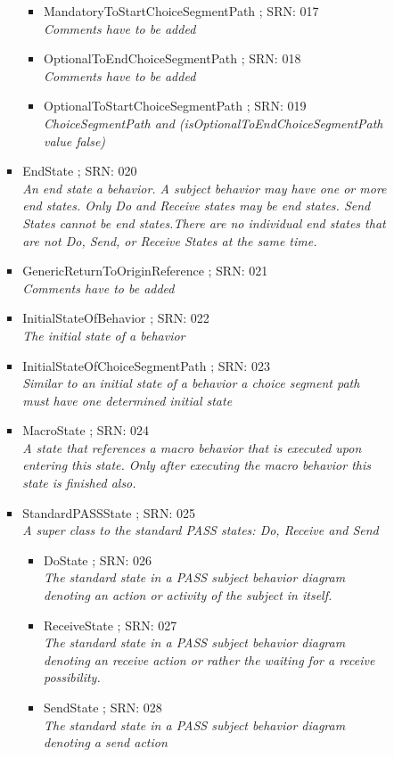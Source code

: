 \begin{itemize}
\begin{itemize}
\begin{itemize}
\begin{itemize}
\begin{itemize}
				\item MandatoryToStartChoiceSegmentPath ; SRN: 017 \\ \textit{Comments have to be added}
				\item OptionalToEndChoiceSegmentPath ; SRN: 018 \\ \textit{Comments have to be added}
				\item OptionalToStartChoiceSegmentPath ; SRN: 019 \\ \textit{ChoiceSegmentPath and (isOptionalToEndChoiceSegmentPath value false)}
			\end{itemize}
			\item EndState ; SRN: 020 \\ \textit{An end state a behavior. A subject behavior may have one or more end states. Only Do and Receive states may be end states. Send States cannot be end states.There are no individual end states that are not Do, Send, or Receive States at the same time.}
			\item GenericReturnToOriginReference ; SRN: 021 \\ \textit{Comments have to be added}
			\item InitialStateOfBehavior ; SRN: 022 \\ \textit{The initial state of a behavior}
			\item InitialStateOfChoiceSegmentPath ; SRN: 023 \\ \textit{Similar to an initial state of a behavior a choice segment path must have one determined initial state}
			\item MacroState ; SRN: 024 \\ \textit{A state that references a macro behavior that is executed upon entering this state. Only after executing the macro behavior this state is finished also.}
			\item StandardPASSState ; SRN: 025 \\ \textit{A super class to the standard PASS states: Do, Receive and Send}
			\begin{itemize}
				\item DoState ; SRN: 026 \\ \textit{The standard state in a PASS subject behavior diagram denoting an action or activity of the subject in itself.}
				\item ReceiveState ; SRN: 027 \\ \textit{The standard state in a PASS subject behavior diagram denoting an receive action or rather the waiting for a receive possibility.}
				\item SendState ; SRN: 028 \\ \textit{The standard state in a PASS subject behavior diagram denoting a send action}

\end{itemize}
\end{itemize}
\end{itemize}
\end{itemize}
\end{itemize}
